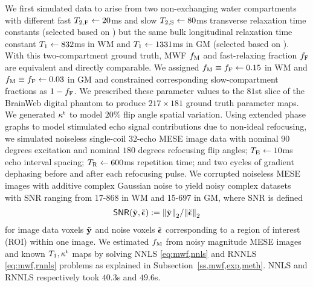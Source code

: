 We first simulated data 
to arise from two non-exchanging water compartments
with different fast $T_{2,\mathrm{F}} \gets 20$ms
and slow $T_{2,\mathrm{S}} \gets 80$ms
transverse relaxation time constants
(selected based on \cite{mackay:94:ivv,deoni:11:com})
but the same bulk longitudinal relaxation time constant
$T_1 \gets 832$ms in WM
and $T_1 \gets 1331$ms in GM
(selected based on \cite{wansapura:99:nrt}).
With this two-compartment ground truth, 
MWF $f_\mathrm{M}$ and fast-relaxing fraction $f_{\mathrm{F}}$
are equivalent and directly comparable.
We assigned 
$f_\mathrm{M} \equiv f_{\mathrm{F}} \gets 0.15$ in WM
and 
$f_\mathrm{M} \equiv f_{\mathrm{F}} \gets 0.03$ in GM
and constrained corresponding slow-compartment fractions
as $1-f_{\mathrm{F}}$.
We prescribed these parameter values
to the $81$st slice
of the BrainWeb digital phantom \cite{collins:98:dac}
to produce $217 \times 181$ ground truth parameter maps.
We generated $\kappa^{\mathrm{t}}$ to model $20$\% flip angle spatial variation.
Using extended phase graphs 
to model stimulated echo signal contributions
due to non-ideal refocusing,
we simulated noiseless single-coil $32$-echo MESE image data
with nominal $90$ degrees excitation 
and nominal $180$ degrees refocusing flip angles;
$T_\mathrm{E} \gets 10$ms echo interval spacing; 
$T_\mathrm{R} \gets 600$ms repetition time;
and two cycles of gradient dephasing 
before and after each refocusing pulse.
We corrupted noiseless MESE images
with additive complex Gaussian noise
to yield noisy complex datasets
with SNR ranging 
from 17-868 in WM
and 15-697 in GM,
where SNR is defined
\begin{align}
	\snr{\bmyt,\bmepst} := \norm{\bmyt}_2/\norm{\bmepst}_2
  \label{eq:mwf,snr}
\end{align}
for image data voxels $\tilde{\mathbf{y}}$ and noise voxels $\tilde{\boldsymbol{\epsilon}}$
corresponding to a region of interest (ROI)
within one image.
We estimated $f_\mathrm{M}$ 
from noisy magnitude MESE images
and known $T_1,\kappa^{\mathrm{t}}$ maps
by solving NNLS \eqref{eq:mwf,nnls}
and RNNLS \eqref{eq:mwf,rnnls} problems
as explained in Subsection~\ref{ss,mwf,exp,meth}.
NNLS and RNNLS respectively took $40.3$s and $49.6$s.

